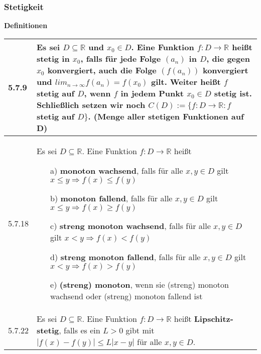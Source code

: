 \subsubsection{Stetigkeit}
    \noindent
    \textbf{Definitionen}
    \begin{table}[H]  
    \begin{tabularx}{\textwidth}{X m{16cm}}
        \toprule

        5.7.9 & Es sei $D \subseteq \mathbb{R}$ und $x_0 \in D$. Eine Funktion $f : D \rightarrow \mathbb{R}$ heißt
                \textbf{stetig} in $x_0$, falls für jede Folge $(a_n)$ in $D$, die gegen $x_0$ konvergiert, auch die Folge $(f(a_n))$ 
                konvergiert und $lim_{n \rightarrow \infty} f(a_n) = f(x_0)$ gilt. \hfill \break 
                Weiter heißt $f$ stetig auf $D$, wenn $f$ in jedem Punkt $x_0 \in D$ stetig ist. \hfill \break
                Schließlich setzen wir noch $C(D) := \{f:D \rightarrow \mathbb{R}: f$ stetig auf $D\}$. 
                (Menge aller stetigen Funktionen auf D) \\
        \midrule
        5.7.18& Es sei $D \subseteq \mathbb{R}$. Eine Funktion $f: D \rightarrow \mathbb{R}$ heißt
                \begin{itemize}
                    \item[a)] \textbf{monoton wachsend}, falls für alle $x,y \in D$ gilt $x \leq y \Rightarrow f(x) \leq f(y)$
                    \item[b)] \textbf{monoton fallend}, falls für alle $x,y \in D$ gilt $x \leq y \Rightarrow f(x) \geq f(y)$
                    \item[c)] \textbf{streng monoton wachsend}, falls für alle $x,y \in D$ gilt $x < y \Rightarrow f(x) < f(y)$
                    \item[d)] \textbf{streng monoton fallend}, falls für alle $x,y \in D$ gilt $x < y \Rightarrow f(x) > f(y)$
                    \item[e)] \textbf{(streng) monoton}, wenn sie (streng) monoton wachsend oder (streng) monoton fallend ist 
                \end{itemize} \\
        \midrule
        5.7.22& Es sei $D \subseteq \mathbb{R}$. Eine Funktion $f : D \rightarrow \mathbb{R}$ heißt \textbf{Lipschitz-stetig}, falls
                es ein $L > 0$ gibt mit $|f(x) - f(y)| \leq L|x-y|$ für alle $x,y \in D$. \\

        \bottomrule

    \end{tabularx}
    \end{table}


